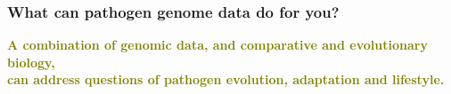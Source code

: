 
%
\begin{frame}
  \frametitle{What can pathogen genome data do for you?}
  \Large{
    \textcolor{olive}{
      \textbf{A combination of genomic data, and comparative and evolutionary biology, \\
      can address questions of pathogen evolution, adaptation and lifestyle.}
    }
  }
\end{frame}